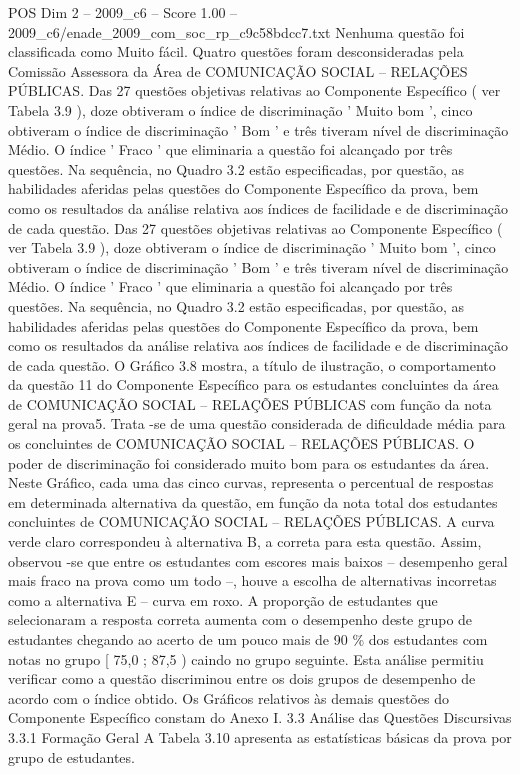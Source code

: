 \begin{textsample}{POS Dim 2 – 2009\_c6 – Score 1.00 – 2009\_c6/enade\_2009\_com\_soc\_rp\_c9c58bdcc7.txt}
Nenhuma questão foi classificada como Muito fácil.
Quatro questões foram desconsideradas pela Comissão Assessora da Área de COMUNICAÇÃO SOCIAL – RELAÇÕES PÚBLICAS.
Das 27 questões objetivas relativas ao Componente Específico ( ver Tabela 3.9 ), doze obtiveram o índice de discriminação ' Muito bom ', cinco obtiveram o índice de discriminação ' Bom ' e três tiveram nível de discriminação Médio.
O índice ' Fraco ' que eliminaria a questão foi alcançado por três questões.
Na sequência, no Quadro 3.2 estão especificadas, por questão, as habilidades aferidas pelas questões do Componente Específico da prova, bem como os resultados da análise relativa aos índices de facilidade e de discriminação de cada questão.
Das 27 questões objetivas relativas ao Componente Específico ( ver Tabela 3.9 ), doze obtiveram o índice de discriminação ' Muito bom ', cinco obtiveram o índice de discriminação ' Bom ' e três tiveram nível de discriminação Médio.
O índice ' Fraco ' que eliminaria a questão foi alcançado por três questões.
Na sequência, no Quadro 3.2 estão especificadas, por questão, as habilidades aferidas pelas questões do Componente Específico da prova, bem como os resultados da análise relativa aos índices de facilidade e de discriminação de cada questão.
O Gráfico 3.8 mostra, a título de ilustração, o comportamento da questão 11 do Componente Específico para os estudantes concluintes da área de COMUNICAÇÃO SOCIAL – RELAÇÕES PÚBLICAS com função da nota geral na prova5.
Trata -se de uma questão considerada de dificuldade média para os concluintes de COMUNICAÇÃO SOCIAL – RELAÇÕES PÚBLICAS.
O poder de discriminação foi considerado muito bom para os estudantes da área.
Neste Gráfico, cada uma das cinco curvas, representa o percentual de respostas em determinada alternativa da questão, em função da nota total dos estudantes concluintes de COMUNICAÇÃO SOCIAL – RELAÇÕES PÚBLICAS.
A curva verde claro correspondeu à alternativa B, a correta para esta questão.
Assim, observou -se que entre os estudantes com escores mais baixos – desempenho geral mais fraco na prova como um todo –, houve a escolha de alternativas incorretas como a alternativa E – curva em roxo.
A proporção de estudantes que selecionaram a resposta correta aumenta com o desempenho deste grupo de estudantes chegando ao acerto de um pouco mais de 90 \% dos estudantes com notas no grupo [ 75,0 ; 87,5 ) caindo no grupo seguinte.
Esta análise permitiu verificar como a questão discriminou entre os dois grupos de desempenho de acordo com o índice obtido.
Os Gráficos relativos às demais questões do Componente Específico constam do Anexo I. 3.3 Análise das Questões Discursivas 3.3.1 Formação Geral A Tabela 3.10 apresenta as estatísticas básicas da prova por grupo de estudantes.

\end{textsample}
